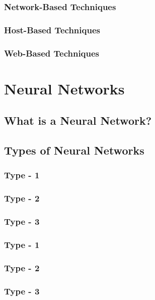 \documentclass[12pt]{article}
\begin{document}
			\subsubsection{Network-Based Techniques}
			\lipsum[1-2]
			\subsubsection{Host-Based Techniques}
			\lipsum[1-2]
			\subsubsection{Web-Based Techniques}
			\lipsum[1-2]
	
	\cleardoublepage
	\section{Neural Networks}\label{sec:neural-networks}
	\lipsum[1]
		\subsection{What is a Neural Network?}
		\lipsum[1-2]
		\subsection{Types of Neural Networks}
		\lipsum[1-2]
			\subsubsection{Type - 1}
			\lipsum[1-2]
			\subsubsection{Type - 2}
			\lipsum[1-2]
			\subsubsection{Type - 3}
			\lipsum[1-2]
			\subsubsection{Type - 1}
			\lipsum[1-2]
			\subsubsection{Type - 2}
			\lipsum[1-2]
			\subsubsection{Type - 3}
			\lipsum[1-2]
\end{document}
